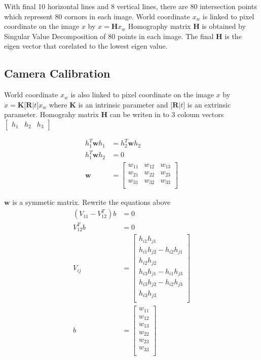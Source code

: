 \documentclass[11pt]{article}
\begin{document}
With final 10 horizontal lines and 8 vertical lines, there are 80 intersection points which represent 80 cornors in each image. World coordinate $x_w$ is  linked to pixel coordinate on the image $x$ by $x= \mathbf{H}x_w$ Homography matrix $\mathbf{H}$ is obtained by Singular Value Decomposition of 80 points in each image. The final $\mathbf{H}$ is the eigen vector that corelated to the lowest eigen value.

 

\subsection*{Camera Calibration}

World coordinate $x_w$ is also linked to pixel coordinate on the image $x$ by $x= \mathbf{K[R}|t]x_w$ where $\mathbf{K}$ is an intrinsic parameter and $\mathbf{[R}|t]$ is an extrinsic parameter. Homograhy matrix $\mathbf{H}$ can be writen in to 3 coloum vectors $\begin{bmatrix} h_1 & h_2 & h_3\end{bmatrix}$

\begin{align*}
h_1^T \mathbf{w} h_1 &= h_2^T \mathbf{w} h_2 \\
h_1^T \mathbf{w} h_2 &= 0 \\
\mathbf{w} &= \begin{bmatrix} 
w_{11} & w_{12} & w_{13} \\
w_{21} & w_{22} & w_{23} \\
w_{31} & w_{32} & w_{33} \\
\end{bmatrix}
\end{align*}

$\mathbf{w}$ is a symmetic matrix. Rewrite the equations above 
\begin{align*}
(V_{11}-V_{12}^T)b &= 0 \\
V_{12}^Tb &= 0 \\
V_{ij} &= \begin{bmatrix} 
h_{i1} h_{j1}\\
h_{i1} h_{j2} - h_{i2} h_{j1} \\
h_{i2} h_{j2}\\
h_{i3} h_{j1} - h_{i1} h_{j3} \\
h_{i3} h_{j2} - h_{i2} h_{j3} \\
h_{i3} h_{j3}\\
\end{bmatrix} \\
b &= 
\begin{bmatrix} 
w_{11} \\
w_{12} \\
w_{13} \\
w_{22} \\
w_{23} \\
w_{33} \\
\end{bmatrix} \\
\end{align*}
\end{document}
